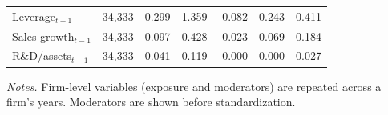 \begin{table}[!htbp]
\begin{tabular}{lrrrrrr}
Leverage$_{t-1}$ & 34,333 & 0.299 & 1.359 & 0.082 & 0.243 & 0.411 \\
Sales growth$_{t-1}$ & 34,333 & 0.097 & 0.428 & -0.023 & 0.069 & 0.184 \\
R\&D/assets$_{t-1}$ & 34,333 & 0.041 & 0.119 & 0.000 & 0.000 & 0.027 \\
\bottomrule
\end{tabular}
\begin{minipage}{0.95\linewidth}\vspace{2pt}\scriptsize\textit{Notes.} Firm-level variables (exposure and moderators) are repeated across a firm's years. Moderators are shown before standardization.\end{minipage}
\end{table}